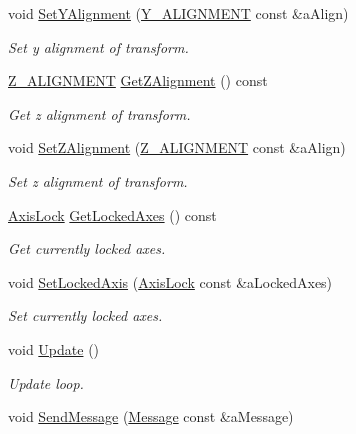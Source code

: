 \begin{DoxyCompactItemize}
void \hyperlink{classTransform_ab752d08242feb5de9d8d09c28a4c839e}{Set\+Y\+Alignment} (\hyperlink{MathExt_8h_a0de91f93b1c4a18a768f6070ddc579b4}{Y\+\_\+\+A\+L\+I\+G\+N\+M\+E\+NT} const \&a\+Align)
\begin{DoxyCompactList}\small\item\em Set y alignment of transform. \end{DoxyCompactList}\item 
\hyperlink{MathExt_8h_a3f663abe91c584f6ee19cfe53b0ad568}{Z\+\_\+\+A\+L\+I\+G\+N\+M\+E\+NT} \hyperlink{classTransform_a7384900a4415d472fbe45ac5e77be2af}{Get\+Z\+Alignment} () const 
\begin{DoxyCompactList}\small\item\em Get z alignment of transform. \end{DoxyCompactList}\item 
void \hyperlink{classTransform_a4b0a31a524c1288b40afb9101c1cc008}{Set\+Z\+Alignment} (\hyperlink{MathExt_8h_a3f663abe91c584f6ee19cfe53b0ad568}{Z\+\_\+\+A\+L\+I\+G\+N\+M\+E\+NT} const \&a\+Align)
\begin{DoxyCompactList}\small\item\em Set z alignment of transform. \end{DoxyCompactList}\item 
\hyperlink{Transform_8h_a8e6f13c41567abc23d55b0843251a8d8}{Axis\+Lock} \hyperlink{classTransform_a8208c878244879a3a0d9dd0e0d66b99a}{Get\+Locked\+Axes} () const 
\begin{DoxyCompactList}\small\item\em Get currently locked axes. \end{DoxyCompactList}\item 
void \hyperlink{classTransform_ab777edfdad41940e45968e50b56e5941}{Set\+Locked\+Axis} (\hyperlink{Transform_8h_a8e6f13c41567abc23d55b0843251a8d8}{Axis\+Lock} const \&a\+Locked\+Axes)
\begin{DoxyCompactList}\small\item\em Set currently locked axes. \end{DoxyCompactList}\item 
void \hyperlink{classTransform_a3256c0fb53d0b341ad8d80fe61e5fb2d}{Update} ()
\begin{DoxyCompactList}\small\item\em Update loop. \end{DoxyCompactList}\item 
void \hyperlink{classTransform_aeea708beadcc8a67261a9dacb8151900}{Send\+Message} (\hyperlink{classMessage}{Message} const \&a\+Message)

\end{DoxyCompactItemize}
